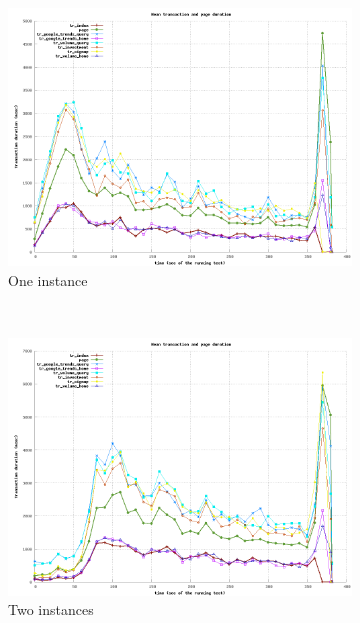 \documentclass[dvips,12pt]{article}
\begin{document}
\newpage
\begin{figure}[h!]
    \centering
    \begin{subfigure}[b]{0.3\textwidth}
        \includegraphics[width=\textwidth]{images/horizontal_m3large_dbm3large/transaction_1.png}
        \caption{One instance}
    \end{subfigure}
    ~ 
    \begin{subfigure}[b]{0.3\textwidth}
        \includegraphics[width=\textwidth]{images/horizontal_m3large_dbm3large/transaction_2.png}
        \caption{Two instances}
    \end{subfigure}
    ~ 
    \begin{subfigure}[b]{0.3\textwidth}

\end{subfigure}
\end{figure}
\end{document}
